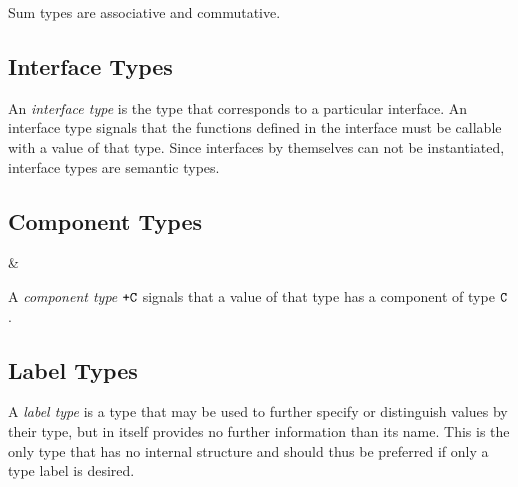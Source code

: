 Sum types are associative and commutative.


\subsection{Interface Types}

\noindent An \textit{interface type} is the type that corresponds to a particular interface. An interface type signals that the functions defined in the interface must be callable with a value of that type. Since interfaces by themselves can not be instantiated, interface types are semantic types. 


\subsection{Component Types}

\begin{grammar}
 &\produce {}
\end{grammar}

\noindent A \textit{component type} $\texttt{+C}$ signals that a value of that type has a component of type $\texttt{C}$.


\subsection{Label Types}

\noindent A \textit{label type} is a type that may be used to further specify or distinguish values by their type, but in itself provides no further information than its name. This is the only type that has no internal structure and should thus be preferred if only a type label is desired.


